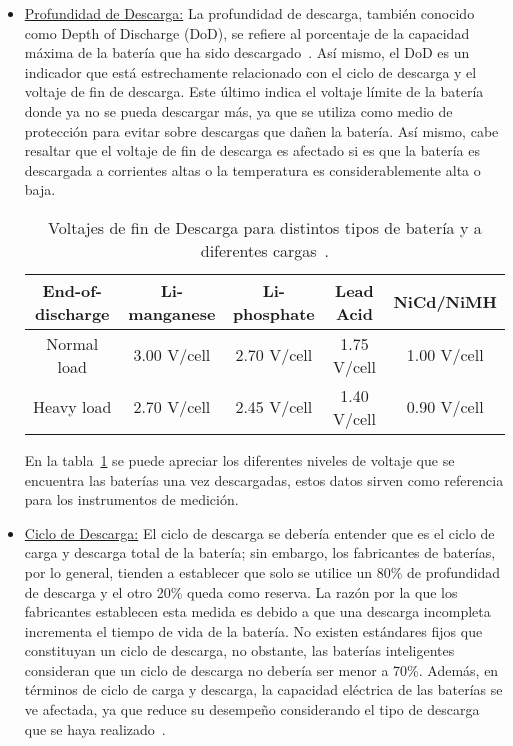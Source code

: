 \begin{itemize}
\item \underline{Profundidad de Descarga:} La profundidad de descarga, también conocido como Depth of Discharge (DoD), se refiere al porcentaje de la capacidad máxima de la batería que ha sido descargado~\cite{MIT-2008}. Así mismo, el DoD es un indicador que está estrechamente relacionado con el ciclo de descarga y el voltaje de fin de descarga. Este último indica el voltaje límite de la batería donde ya no se pueda descargar más, ya que se utiliza como medio de protección para evitar sobre descargas que dañen la batería. Así mismo, cabe resaltar que el voltaje de fin de descarga es afectado si es que la batería es descargada a corrientes altas o la temperatura es considerablemente alta o baja.

\begin{table}[htbp]
\caption{Voltajes de fin de Descarga para distintos tipos de batería y a diferentes cargas~\cite{Buchmann2011}.}
\begin{center}
\begin{tabular}{|c|c|c|c|c|}
\hline
\textbf{End-of-discharge} &  \textbf{Li-manganese} & \textbf{Li-phosphate} & \textbf{Lead Acid} & \textbf{NiCd/NiMH} \\
\hline
Normal load & 3.00 V/cell & 2.70 V/cell & 1.75 V/cell & 1.00 V/cell \\
\hline
Heavy load & 2.70 V/cell & 2.45 V/cell & 1.40 V/cell & 0.90 V/cell \\
\hline
\end{tabular}
\end{center}
\label{tab:batcarga}
\end{table}

En la tabla~\ref{tab:batcarga} se puede apreciar los diferentes niveles de voltaje que se encuentra las baterías una vez descargadas, estos datos sirven como referencia para los instrumentos de medición.

\item \underline{Ciclo de Descarga:} El ciclo de descarga se debería entender que es el ciclo de carga y descarga total de la batería; sin embargo, los fabricantes de baterías, por lo general, tienden a establecer que solo se utilice un 80\% de profundidad de descarga y el otro 20\% queda como reserva. La razón por la que los fabricantes establecen esta medida es debido a que una descarga incompleta incrementa el tiempo de vida de la batería. No existen estándares fijos que constituyan un ciclo de descarga, no obstante, las baterías inteligentes consideran que un ciclo de descarga no debería ser menor a 70\%. Además, en términos de ciclo de carga y descarga, la capacidad eléctrica de las baterías se ve afectada, ya que reduce su desempeño considerando el tipo de descarga que se haya realizado~\cite{Buchmann2011}.


\end{itemize}
